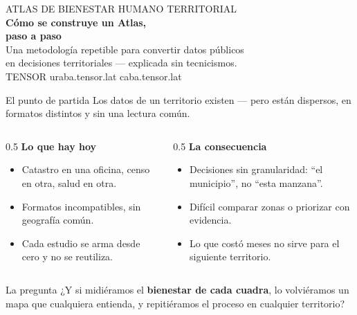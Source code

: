 \documentclass[aspectratio=169,11pt]{beamer}
\newcommand{\lead}[1]{{\color{tPrimary}\large #1}\par\medskip}
\begin{document}
{
\begin{frame}[plain]
\vspace{1.6cm}
{\color{tAccent}\ttfamily\small ATLAS DE BIENESTAR HUMANO TERRITORIAL}\\[0.5em]
{\color{tPrimary}\fontsize{30}{34}\selectfont\bfseries Cómo se construye un Atlas,\\ paso a paso}\\[0.6em]
{\color{tBody}\large Una metodología repetible para convertir datos públicos\\ en decisiones territoriales — explicada sin tecnicismos.}\\[1.4cm]
{\color{tMuted}\ttfamily\footnotesize TENSOR \quad\textbar\quad uraba.tensor.lat \;\textbullet\; caba.tensor.lat}
\end{frame}}

\begin{frame}{El punto de partida}
\lead{Los datos de un territorio existen — pero están dispersos, en formatos distintos y sin una lectura común.}
\begin{columns}[T]
\begin{column}{0.5\textwidth}
\textbf{\color{tPrimary}Lo que hay hoy}
\begin{itemize}\footnotesize
  \item Catastro en una oficina, censo en otra, salud en otra.
  \item Formatos incompatibles, sin geografía común.
  \item Cada estudio se arma desde cero y no se reutiliza.
\end{itemize}
\end{column}
\begin{column}{0.5\textwidth}
\textbf{\color{tPrimary}La consecuencia}
\begin{itemize}\footnotesize
  \item Decisiones sin granularidad: ``el municipio'', no ``esta manzana''.
  \item Difícil comparar zonas o priorizar con evidencia.
  \item Lo que costó meses no sirve para el siguiente territorio.
\end{itemize}
\end{column}
\end{columns}
\medskip
\begin{block}{La pregunta}
¿Y si midiéramos el \textbf{bienestar de cada cuadra}, lo volviéramos un mapa que cualquiera entienda, y repitiéramos el proceso en cualquier territorio?
\end{block}
\end{frame}
\end{document}
